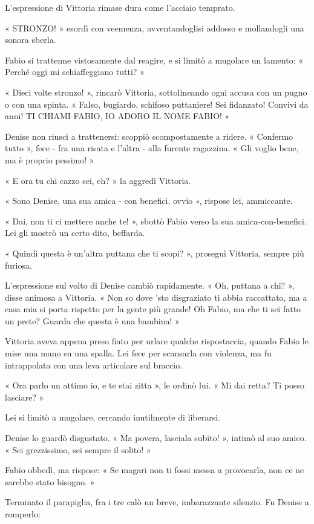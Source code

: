 L'espressione di Vittoria rimase dura come l'acciaio temprato.

« STRONZO! » esordì con veemenza, avventandoglisi addosso e mollandogli una sonora sberla.

Fabio si trattenne vistosamente dal reagire, e si limitò a mugolare un lamento: « Perché oggi mi schiaffeggiano tutti? »

« Dieci volte stronzo! », rincarò Vittoria, sottolineando ogni accusa con un pugno o con una spinta. « Falso, bugiardo, schifoso puttaniere! Sei fidanzato! Convivi da anni! TI CHIAMI FABIO, IO ADORO IL NOME FABIO! »

Denise non riuscì a trattenersi: scoppiò scompostamente a ridere. « Confermo tutto », fece - fra una risata e l'altra - alla furente ragazzina. « Gli voglio bene, ma è proprio pessimo! »

« E ora tu chi cazzo sei, eh? » la aggredì Vittoria.

« Sono Denise, una sua amica - con benefici, ovvio », rispose lei, ammiccante.

« Dai, non ti ci mettere anche te! », sbottò Fabio verso la sua amica-con-benefici. Lei gli mostrò un certo dito, beffarda.

« Quindi questa è un'altra puttana che ti scopi? », proseguì Vittoria, sempre più furiosa.

L'espressione sul volto di Denise cambiò rapidamente. « Oh, puttana a chi? », disse animosa a Vittoria. « Non so dove 'sto disgraziato ti abbia raccattato, ma a casa mia si porta rispetto per la gente più grande! Oh Fabio, ma che ti sei fatto un prete? Guarda che questa è una bambina! »

Vittoria aveva appena preso fiato per urlare qualche rispostaccia, quando Fabio le mise una mano su una spalla. Lei fece per scansarla con violenza, ma fu intrappolata con una leva articolare sul braccio.

« Ora parlo un attimo io, e te stai zitta », le ordinò lui. « Mi dai retta? Ti posso lasciare? »

Lei si limitò a mugolare, cercando inutilmente di liberarsi.

Denise lo guardò disgustato. « Ma povera, lasciala subito! », intimò al suo amico. « Sei grezzissimo, sei sempre il solito! »

Fabio obbedì, ma rispose: « Se magari non ti fossi messa a provocarla, non ce ne sarebbe stato bisogno. »

Terminato il parapiglia, fra i tre calò un breve, imbarazzante silenzio. Fu Denise a romperlo:

